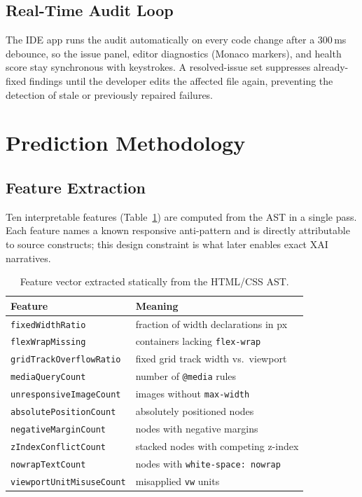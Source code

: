 \documentclass[conference]{IEEEtran}
\begin{document}
\subsection{Real-Time Audit Loop}
The IDE app runs the audit automatically on every code change after a
300\,ms debounce, so the issue panel, editor diagnostics (Monaco
markers), and health score stay synchronous with keystrokes. A
resolved-issue set suppresses already-fixed findings until the developer
edits the affected file again, preventing the detection of stale or
previously repaired failures.

\section{Prediction Methodology}

\subsection{Feature Extraction}
Ten interpretable features (Table~\ref{tab:features}) are computed from
the AST in a single pass. Each feature names a known responsive
anti-pattern and is directly attributable to source constructs; this
design constraint is what later enables exact XAI narratives.

\begin{table}[!t]
\caption{Feature vector extracted statically from the HTML/CSS AST.}
\label{tab:features}
\centering
\small
\begin{tabular}{@{}ll@{}}
\toprule
\textbf{Feature} & \textbf{Meaning} \\
\midrule
\texttt{fixedWidthRatio} & fraction of width declarations in px \\
\texttt{flexWrapMissing} & containers lacking \texttt{flex-wrap} \\
\texttt{gridTrackOverflowRatio} & fixed grid track width vs.\ viewport \\
\texttt{mediaQueryCount} & number of \texttt{@media} rules \\
\texttt{unresponsiveImageCount} & images without \texttt{max-width} \\
\texttt{absolutePositionCount} & absolutely positioned nodes \\
\texttt{negativeMarginCount} & nodes with negative margins \\
\texttt{zIndexConflictCount} & stacked nodes with competing z-index \\
\texttt{nowrapTextCount} & nodes with \texttt{white-space: nowrap} \\
\texttt{viewportUnitMisuseCount} & misapplied \texttt{vw} units \\
\bottomrule
\end{tabular}
\end{table}
\end{document}
